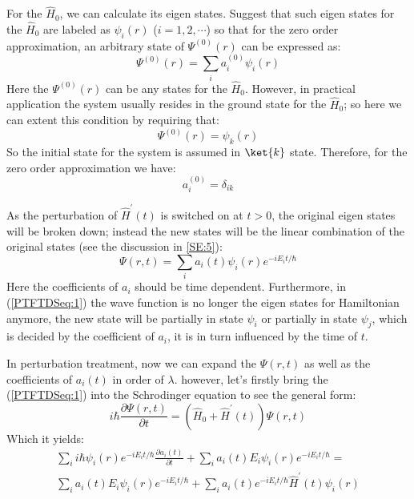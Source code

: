 For the $\hat{H}_{0}$, we can calculate its eigen states. Suggest
that such eigen states for the $\hat{H}_{0}$ are labeled as
$\psi_{i}(r)$ ($i=1,2,\cdots$) so that for the zero order
approximation, an arbitrary state of $\Psi^{(0)}(r)$ can be
expressed as:
\begin{equation}\label{}
\Psi^{(0)}(r) = \sum_{i}a_{i}^{(0)}\psi_{i}(r)
\end{equation}
Here the $\Psi^{(0)}(r)$ can be any states for the $\hat{H}_{0}$.
However, in practical application the system usually resides in the
ground state for the $\hat{H}_{0}$; so here we can extent this
condition by requiring that:
\begin{equation}\label{}
\Psi^{(0)}(r) = \psi_{k}(r)
\end{equation}
So the initial state for the system is assumed in $\ket{k}$ state.
Therefore, for the zero order approximation we have:
\begin{equation}\label{PTFTDSeq:4}
a_{i}^{(0)} = \delta_{ik}
\end{equation}

As the perturbation of $\hat{H}^{'}(t)$ is switched on at $t > 0$,
the original eigen states will be broken down; instead the new
states will be the linear combination of the original states (see
the discussion in \ref{SE:5}):
\begin{equation}\label{PTFTDSeq:1}
\Psi(r,t) = \sum_{i}a_{i}(t)\psi_{i}(r)e^{-iE_{i}t/\hbar}
\end{equation}
Here the coefficients of $a_{i}$ should be time dependent.
Furthermore, in (\ref{PTFTDSeq:1}) the wave function is no longer
the eigen states for Hamiltonian anymore, the new state will be
partially in state $\psi_{i}$ or partially in state $\psi_{j}$,
which is decided by the coefficient of $a_{i}$, it is in turn
influenced by the time of $t$.

In perturbation treatment, now we can expand the $\Psi(r,t)$ as well
as the coefficients of $a_{i}(t)$ in order of $\lambda$. however,
let's firstly bring the (\ref{PTFTDSeq:1}) into the Schrodinger
equation to see the general form:
\begin{equation}\label{}
i \hbar \frac{\partial \Psi(r,t)}{\partial t} = (\hat{H}_{0} +
\hat{H}^{'}(t))\Psi(r,t)
\end{equation}
Which it yields:
\begin{multline}\label{}
\sum_{i}i\hbar \psi_{i}(r)e^{-iE_{i}t/\hbar}\frac{\partial
a_{i}(t)}{\partial t} +
\sum_{i}a_{i}(t)E_{i}\psi_{i}(r)e^{-iE_{i}t/\hbar} = \\
\sum_{i}a_{i}(t)E_{i}\psi_{i}(r)e^{-iE_{i}t/\hbar} +
\sum_{i}a_{i}(t)e^{-iE_{i}t/\hbar}\hat{H}^{'}(t)\psi_{i}(r)
\end{multline}

